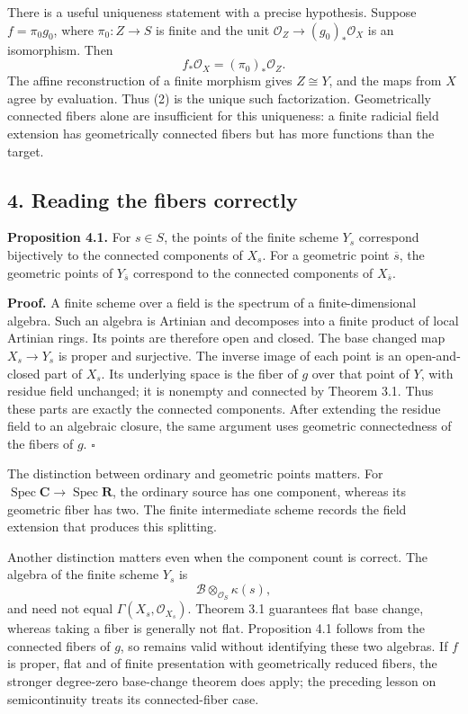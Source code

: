 \documentclass[11pt]{article}
\begin{document}
There is a useful uniqueness statement with a precise hypothesis.
Suppose \(f=\pi_0g_0\), where \(\pi_0:Z\to S\) is finite and the unit
\(\mathcal O_Z\to(g_0)_*\mathcal O_X\) is an isomorphism. Then \[
f_*\mathcal O_X=(\pi_0)_*\mathcal O_Z.
\] The affine reconstruction of a finite morphism gives \(Z\cong Y\),
and the maps from \(X\) agree by evaluation. Thus (2) is the unique such
factorization. Geometrically connected fibers alone are insufficient for
this uniqueness: a finite radicial field extension has geometrically
connected fibers but has more functions than the target.

\subsection{4. Reading the fibers
correctly}\label{reading-the-fibers-correctly}

\textbf{Proposition 4.1.} For \(s\in S\), the points of the finite
scheme \(Y_s\) correspond bijectively to the connected components of
\(X_s\). For a geometric point \(\overline s\), the geometric points of
\(Y_{\overline s}\) correspond to the connected components of
\(X_{\overline s}\).

\textbf{Proof.} A finite scheme over a field is the spectrum of a
finite-dimensional algebra. Such an algebra is Artinian and decomposes
into a finite product of local Artinian rings. Its points are therefore
open and closed. The base changed map \(X_s\to Y_s\) is proper and
surjective. The inverse image of each point is an open-and-closed part
of \(X_s\). Its underlying space is the fiber of \(g\) over that point
of \(Y\), with residue field unchanged; it is nonempty and connected by
Theorem 3.1. Thus these parts are exactly the connected components.
After extending the residue field to an algebraic closure, the same
argument uses geometric connectedness of the fibers of \(g\).
\(\square\)

The distinction between ordinary and geometric points matters. For
\(\operatorname{Spec}\mathbf C\to\operatorname{Spec}\mathbf R\), the
ordinary source has one component, whereas its geometric fiber has two.
The finite intermediate scheme records the field extension that produces
this splitting.

Another distinction matters even when the component count is correct.
The algebra of the finite scheme \(Y_s\) is \[
\mathcal B\otimes_{\mathcal O_S}\kappa(s),
\] and need not equal \(\Gamma(X_s,\mathcal O_{X_s})\). Theorem 3.1
guarantees flat base change, whereas taking a fiber is generally not
flat. Proposition 4.1 follows from the connected fibers of \(g\), so
remains valid without identifying these two algebras. If \(f\) is
proper, flat and of finite presentation with geometrically reduced
fibers, the stronger degree-zero base-change theorem does apply; the
preceding lesson on semicontinuity treats its connected-fiber case.
\end{document}
